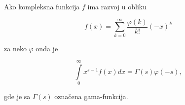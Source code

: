 \documentclass[11pt]{article}
\begin{document}
	\noindent
	Ako kompleksna funkcija $ f $ ima razvoj u obliku

	\begin{equation*}
		f(x) = \sum^\infty_{k=0} \frac{\varphi (k)}{k!}(-x)^k
	\end{equation*}

	za neko $ \varphi $ onda je

	\begin{equation*}
		\int\limits^\infty_0 x^{s-1} f(x) dx = \Gamma (s) \varphi (-s),
	\end{equation*}

	gde je sa $ \Gamma (s) $ ozna\v cena gama-funkcija.
\end{document}
